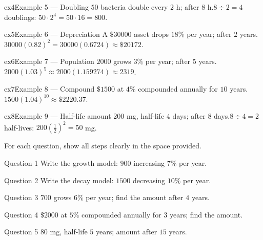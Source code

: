 \documentclass[11pt]{article}
\begin{document}
\begin{example}{ex4}{Example 5 --- Doubling}
$50$ bacteria double every $2$ h; after $8$ h.\soln $8\div2=4$ doublings: $50\cdot2^{4}=50\cdot16=800$.
\end{example}

\begin{example}{ex5}{Example 6 --- Depreciation}
A $\$30000$ asset drops $18\%$ per year; after $2$ years.\soln $30000(0.82)^{2}=30000(0.6724)\approx\$20172$.
\end{example}

\begin{example}{ex6}{Example 7 --- Population}
$2000$ grows $3\%$ per year; after $5$ years.\soln $2000(1.03)^{5}\approx2000(1.159274)\approx2319$.
\end{example}

\begin{example}{ex7}{Example 8 --- Compound}
$\$1500$ at $4\%$ compounded annually for $10$ years.\soln $1500(1.04)^{10}\approx\$2220.37$.
\end{example}

\begin{example}{ex8}{Example 9 --- Half-life amount}
$200$ mg, half-life $4$ days; after $8$ days.\soln $8\div4=2$ half-lives: $200\left(\tfrac12\right)^{2}=50$ mg.
\end{example}

\clearpage
{}
For each question, show all steps clearly in the space provided.

\begin{qbox}{Question 1}
Write the growth model: $900$ increasing $7\%$ per year.\workspace{2.4cm}
\end{qbox}

\begin{qbox}{Question 2}
Write the decay model: $1500$ decreasing $10\%$ per year.\workspace{2.4cm}
\end{qbox}

\begin{qbox}{Question 3}
$700$ grows $6\%$ per year; find the amount after $4$ years.\workspace{3cm}
\end{qbox}

\begin{qbox}{Question 4}
$\$2000$ at $5\%$ compounded annually for $3$ years; find the amount.\workspace{3cm}
\end{qbox}

\begin{qbox}{Question 5}
$80$ mg, half-life $5$ years; amount after $15$ years.\workspace{2.4cm}
\end{qbox}
\end{document}
